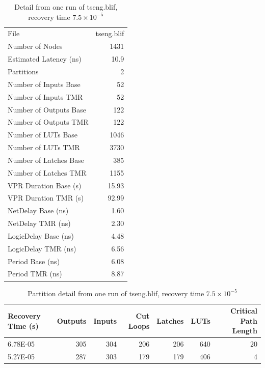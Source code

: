 \documentclass[12pt,final,oneside]{dwThesis} %
\begin{document}
      \begin{table}
   	\begin{tabular}{lr}
   	\toprule
File & tseng.blif\\
Number of Nodes & 1431\\
Estimated Latency (ns)& 10.9\\
Partitions & 2\\
Number of Inputs Base & 52\\
Number of Inputs TMR & 52\\
Number of Outputs Base & 122\\
Number of Outputs TMR & 122\\
Number of LUTs Base & 1046\\
Number of LUTs TMR & 3730\\
Number of Latches Base & 385\\
Number of Latches TMR & 1155\\
VPR Duration Base (s) & 15.93\\
VPR Duration TMR (s) & 92.99\\
NetDelay Base (ns) & 1.60\\
NetDelay TMR (ns) & 2.30\\
LogicDelay Base (ns) & 4.48\\
LogicDelay TMR (ns) & 6.56\\
Period Base (ns) & 6.08\\
Period TMR (ns) & 8.87\\
\bottomrule
   	\end{tabular}
   	\caption{Detail from one run of tseng.blif, recovery time $7.5\times10^{-5}$}\label{tabSanity}
   \end{table}
   
      \begin{table}
   	\begin{tabular}{lrrrrrr}
   	\toprule
Recovery Time (s) & Outputs & Inputs & Cut Loops & Latches & \glspl{LUT} & Critical Path Length\\
   		\midrule
6.78E-05 & 305 & 304 & 206 & 206 & 640 & 20\\
5.27E-05 & 287 & 303 & 179 & 179 & 406 & 4\\
\bottomrule
   	\end{tabular}
   	\caption{Partition detail from one run of tseng.blif, recovery time $7.5\times10^{-5}$}\label{tabSanityPartitions}
   \end{table}
\end{document}
